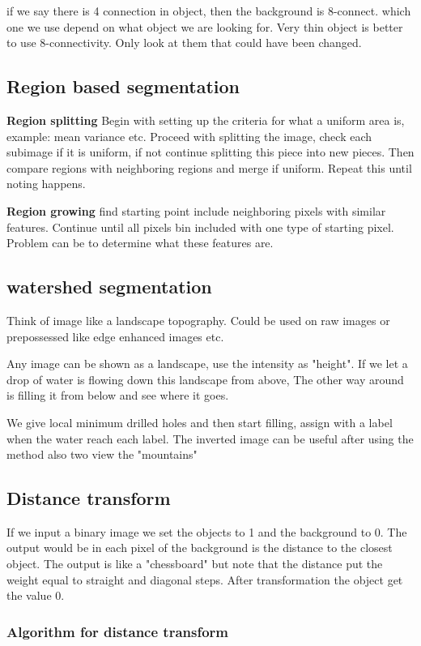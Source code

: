 if we say there is 4 connection in object, then the background is 8-connect. 
which one we use depend on what object we are looking for. Very thin object is better to use 8-connectivity. Only look at them that could have been changed. 

\subsection*{Region based segmentation}
\textbf{Region splitting} Begin with setting up the criteria for what a uniform area is, example: mean variance etc. Proceed with splitting the image, check each subimage if it is uniform, if not continue splitting this piece into new pieces. Then compare regions with neighboring regions and merge if uniform. Repeat this until noting happens. 

\textbf{Region growing} find starting point include neighboring pixels with similar features. Continue until all pixels bin included with one type of starting pixel. Problem can be to determine what these features are. 

\subsection*{watershed segmentation}
Think of image like a landscape topography. Could be used on raw images or prepossessed like edge enhanced images etc. 

Any image can be shown as a landscape, use the intensity as "height". If we let a drop of water is flowing down this landscape from above, The other way around is filling it from below and see where it goes. 

We give local minimum drilled holes and then start filling, assign with a label when the water reach each label. The inverted image can be useful after using the method also two view the "mountains" 



\subsection*{Distance transform}
If we input a binary image we set the objects to 1 and the background to 0. The output would be in each pixel of the background is the distance to the closest object. The output is like a "chessboard" but note that the distance put the weight equal to straight and diagonal steps. After transformation the object get the value 0. 

\subsubsection{Algorithm for distance transform}

